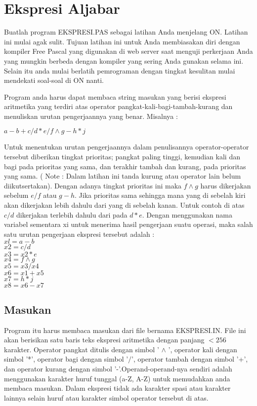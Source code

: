 \documentclass[a4paper,10pt,makeidx]{article}
\begin{document}
\section{Ekspresi Aljabar}
\par
\indent
\indent
Buatlah program EKSPRESI.PAS sebagai latihan Anda menjelang ON.
Latihan ini mulai agak sulit. Tujuan latihan ini untuk Anda membiasakan diri
dengan kompiler Free Pascal yang digunakan di web server saat menguji
perkerjaan
Anda yang mungkin berbeda dengan kompiler yang sering Anda gunakan selama ini.
Selain itu anda mulai berlatih pemrograman dengan tingkat kesulitan mulai
mendekati soal-soal di ON nanti.
\par
\indent
\indent
Program anda harus dapat membaca string masukan yang berisi ekspresi
aritmetika yang terdiri atas operator pangkat-kali-bagi-tambah-kurang dan
menuliskan urutan pengerjaannya yang benar. Misalnya : \\
\begin{center}
       $a-b+c/d*e/f\wedge g-h*j$
\end{center}
\par
\indent
\indent
Untuk menentukan urutan pengerjaannya dalam penulisannya operator-operator
tersebut diberikan tingkat prioritas; pangkat paling tinggi, kemudian kali
dan bagi pada prioritas
yang sama, dan terakhir tambah dan kurang, pada prioritas yang sama.
( Note :
Dalam latihan ini tanda kurung atau operator lain belum diikutsertakan).
Dengan adanya tingkat prioritas ini maka $f\wedge g$ harus dikerjakan
sebelum {\bfseries $e/f$}
atau {\bfseries $g-h$}. Jika prioritas sama sehingga mana yang di sebelah kiri
akan dikerjakan
lebih dahulu dari yang di sebelah kanan. Untuk contoh di atas
{\bfseries $c/d$}  dikerjakan
terlebih dahulu dari pada {\bfseries  $d*e$}. Dengan menggunakan nama variabel
sementara xi
untuk menerima hasil pengerjaan suatu operasi, maka salah satu urutan
pengerjaan ekspresi tersebut adalah : \\
$xl = a-b  $ \\
$x2 = c/d  $ \\
$x3 = x2*e $ \\
$x4 = f \wedge g$ \\
$x5 = x3/x4$ \\
$x6 = x1+x5$ \\
$x7 = h*j  $ \\
$x8 = x6-x7$ \\

\subsection{Masukan}
\par
\indent
\indent
Program itu harus membaca masukan dari file bernama EKSPRESI.IN. File ini akan
berisikan satu baris teks ekspresi aritmetika dengan panjang $< 256$ karakter.
Operator pangkat ditulis dengan simbol ' $\wedge$ ', operator kali dengan simbol '*',
operator bagi dengan simbol '$/$', operator tambah dengan simbol '+', dan operator
kurang dengan simbol '-'.Operand-operand-nya sendiri adalah menggunakan
karakter huruf tunggal (a-Z, A-Z) untuk memudahkan anda membaca masukan. Dalam
ekspresi tidak ada karakter spasi atau karakter lainnya selain huruf atau
karakter simbol operator tersebut di atas.
\end{document}
